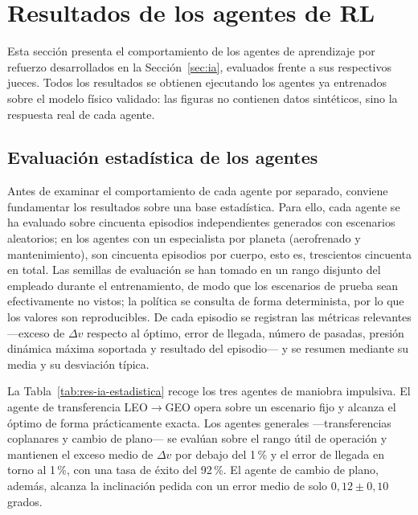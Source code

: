 \section{Resultados de los agentes de RL}
\label{sec:res-ia}

Esta sección presenta el comportamiento de los agentes de aprendizaje por refuerzo desarrollados en la Sección~\ref{sec:ia}, evaluados frente a sus respectivos jueces. Todos los resultados se obtienen ejecutando los agentes ya entrenados sobre el modelo físico validado: las figuras no contienen datos sintéticos, sino la respuesta real de
cada agente.

\subsection{Evaluación estadística de los agentes}
\label{sec:res-ia-stats}

Antes de examinar el comportamiento de cada agente por separado, conviene fundamentar los resultados sobre una base estadística. Para ello, cada agente se ha evaluado sobre cincuenta episodios independientes generados con escenarios aleatorios; en los agentes con un especialista por planeta (aerofrenado y mantenimiento), son cincuenta episodios por cuerpo, esto es, trescientos cincuenta en total. Las semillas de evaluación se han tomado en un rango disjunto del empleado durante el entrenamiento, de modo que los escenarios de prueba sean efectivamente no vistos; la política se consulta de forma determinista, por lo que los valores son reproducibles. De cada episodio se registran las métricas relevantes ---exceso de $\Delta v$ respecto al óptimo, error de llegada, número de pasadas, presión dinámica máxima soportada y resultado del episodio--- y se resumen mediante su media y su desviación típica.

La Tabla~\ref{tab:res-ia-estadistica} recoge los tres agentes de maniobra impulsiva. El agente de transferencia \gls{LEO}$\rightarrow$\gls{GEO} opera sobre un escenario fijo y alcanza el óptimo de forma prácticamente exacta. Los agentes generales ---transferencias coplanares y cambio de plano--- se evalúan sobre el rango útil de operación y mantienen el exceso medio de $\Delta v$ por debajo del 1\,\% y el error de llegada en torno al 1\,\%, con una tasa de éxito del 92\,\%. El agente de cambio de plano, además, alcanza la inclinación pedida con un error medio de solo $0{,}12 \pm 0{,}10$ grados.

